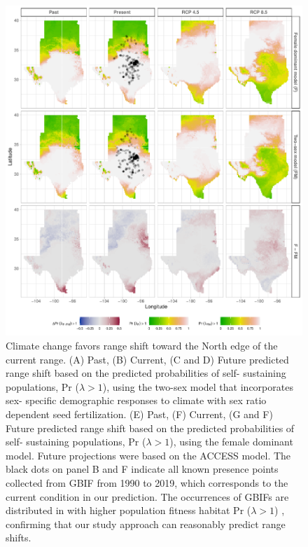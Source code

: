 \documentclass[12pt]{article}\usepackage[]{graphicx}\usepackage[dvipsnames]{xcolor}
\begin{document}
\begin{figure}[H]
	\begin{center}
		\includegraphics[width=0.95\linewidth]{Figures/Fig_geoPrlambdaacc.pdf}
		\caption{Climate change favors range shift toward the North edge of the current range.
			(A) Past, (B) Current, (C and D) Future predicted range shift based on the predicted probabilities of self- sustaining populations, Pr ($\lambda > 1$), using the two-sex model that incorporates sex- specific demographic responses to climate with sex ratio dependent seed fertilization.
			(E) Past, (F) Current, (G and F) Future  predicted range shift based on the predicted probabilities of self- sustaining populations, Pr ($\lambda > 1$), using the female dominant model.
			Future projections were based on the  ACCESS model.
			The black dots on panel B and F indicate all known presence points collected from GBIF from 1990 to 2019, which corresponds to the current condition in our prediction. 
			The occurrences of GBIFs are distributed in with higher population fitness habitat Pr ($\lambda > 1$) , confirming that our study approach can reasonably predict range shifts.}
		\label{Sup:geoprojacc}
	\end{center}
\end{figure}
\end{document}
